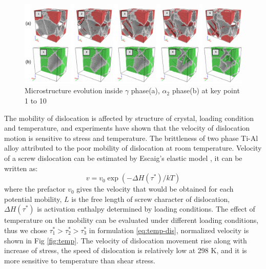 \documentclass[metals,article,submit,moreauthors,pdftex,10pt,a4paper]{Definitions/mdpi}
\begin{document}
\begin{figure}[ht] 
	\centering
	\includegraphics[width=1\linewidth]{img/def2}
	\caption{Microstructure evolution inside $\gamma$ phase(a), $\alpha_2$ phase(b) at key point 1 to 10}
	\label{fig:Defect}
\end{figure}

The mobility of dislocation is affected by structure of crystal, loading condition and temperature, and experiments have shown that the velocity of dislocation motion is sensitive to stress and temperature\cite{Stein1960}. The brittleness of two phase Ti-Al alloy attributed to the poor mobility of dislocation at room temperature. Velocity of a screw dislocation can be estimated by Escaig's elastic model \cite{Escaig1968}, it can be written as:
\begin{equation}\label{eq:temp-dis}
v = v_0 \exp(-\Delta H(\tau^*)/kT)
\end{equation}
where the prefactor $v_0$ gives the velocity that would be obtained for each potential mobility, $L$ is the free length of screw character of dislocation, $\Delta H(\tau^*)$ is activation enthalpy determined by loading conditions. The effect of temperature on the mobility can be evaluated under different loading conditions, thus we chose  $\tau_1^*>\tau_2^*>\tau_3^*$ in formulation \ref{eq:temp-dis}, normalized velocity is shown in Fig \ref{fig:temp}. The  velocity  of dislocation movement rise along with increase of  stress, the speed of dislocation is relatively low at 298 K, and it is more sensitive to temperature than shear stress. 
\end{document}
